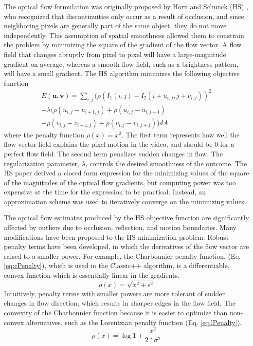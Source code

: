 \documentclass[10pt,twocolumn,letterpaper]{article}
\begin{document}
The optical flow formulation was originally proposed by Horn and Schunck (HS) \cite{horn}, who recognized that discontinuities only occur as a result of occlusion, and since neighboring pixels are generally part of the same object, they do not move independently. This assumption of spatial smoothness allowed them to constrain the problem by minimizing the square of the gradient of the flow vector. A flow field that changes abruptly from pixel to pixel will have a large-magnitude gradient on average, whereas a smooth flow field, such as a brightness pattern, will have a small gradient. The HS algorithm minimizes the following objective function
\begin{multline} \label{eq:hsObj}
E( \mathbf{u}, \mathbf{v}) = \sum\limits_{i,j} (\rho(I_1(i,j) - I_2(i+u_{i,j},j+v_{i,j}))^2 \\ 
+ \lambda (\rho(u_{i,j}-u_{i+1,j}) + \rho(u_{i,j}-u_{i,j+1}) \\ 
+ \rho(v_{i,j}-v_{i+1,j}) +  \rho(v_{i,j}-v_{i,j+1})  ) dA
\end{multline}
where the penalty function $\rho(x) = x^2$. The first term represents how well the flow vector field explains the pixel motion in the video, and should be 0 for a perfect flow field. The second term penalizes sudden changes in flow. The regularization parameter, $\lambda$, controls the desired smoothness of the outcome. The HS paper derived a closed form expression for the minimizing values of the square of the magnitudes of the optical flow gradients, but computing power was too expensive at the time for the expression to be practical. Instead, an approximation scheme was used to iteratively converge on the minimizing values.

The optical flow estimates produced by the HS objective function are significantly affected by outliers due to occlusion, reflection, and motion boundaries. Many modifications have been proposed to the HS minimization problem. Robust penalty terms have been developed, in which the derivatives of the flow vector are raised to a smaller power. For example, the Charbonnier penalty function, (Eq. \ref{eq:cPenalty}), which is used in the Classic++ algorithm, is a differentiable, convex function which is essentially linear in the gradients. 
\begin{equation} \label{eq:cPenalty}
\rho(x) = \sqrt{x^2 + \epsilon^2}
\end{equation}
Intuitively, penalty terms with smaller powers are more tolerant of sudden changes in flow direction, which results in sharper edges in the flow field. The convexity of the Charbonnier function because it is easier to optimize than non-convex alternatives, such as the Lorentzian penalty function (Eq. \ref{eq:lPenalty}).
\begin{equation} \label{eq:lPenalty}
\rho(x) = \log{1 + \frac{x^2}{2*\sigma^2}}
\end{equation}
\end{document}
